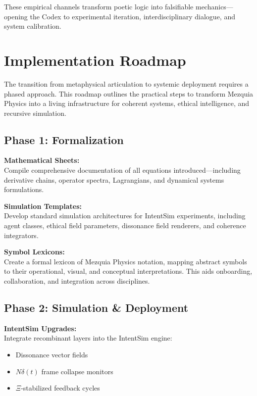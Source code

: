 \documentclass[12pt]{article}
\begin{document}
These empirical channels transform poetic logic into falsifiable mechanics—opening the Codex to experimental iteration, interdisciplinary dialogue, and system calibration.

\section{Implementation Roadmap}

The transition from metaphysical articulation to systemic deployment requires a phased approach. This roadmap outlines the practical steps to transform Mezquia Physics into a living infrastructure for coherent systems, ethical intelligence, and recursive simulation.

\subsection{Phase 1: Formalization}

\textbf{Mathematical Sheets:} \\
Compile comprehensive documentation of all equations introduced—including derivative chains, operator spectra, Lagrangians, and dynamical systems formulations.

\textbf{Simulation Templates:} \\
Develop standard simulation architectures for IntentSim experiments, including agent classes, ethical field parameters, dissonance field renderers, and coherence integrators.

\textbf{Symbol Lexicons:} \\
Create a formal lexicon of Mezquia Physics notation, mapping abstract symbols to their operational, visual, and conceptual interpretations. This aids onboarding, collaboration, and integration across disciplines.

\subsection{Phase 2: Simulation \& Deployment}

\textbf{IntentSim Upgrades:} \\
Integrate recombinant layers into the IntentSim engine:
\begin{itemize}
  \item Dissonance vector fields
  \item \(N\delta(t)\) frame collapse monitors
  \item \(\Xi\)-stabilized feedback cycles
\end{itemize}
\end{document}
